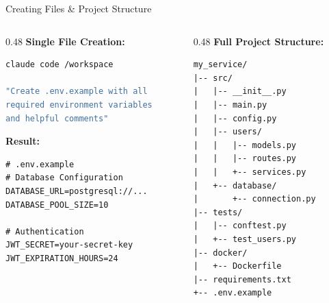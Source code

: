 \documentclass[aspectratio=169,11pt]{beamer}
\begin{document}
\begin{frame}[fragile]{Creating Files \& Project Structure}
    \begin{columns}[T]
        \begin{column}{0.48\textwidth}
            \textbf{Single File Creation:}
            \begin{lstlisting}[language=bash, basicstyle=\ttfamily\tiny]
claude code /workspace

"Create .env.example with all
required environment variables
and helpful comments"
            \end{lstlisting}

            \vspace{0.3cm}
            \textbf{Result:}
            \begin{lstlisting}[basicstyle=\ttfamily\tiny]
# .env.example
# Database Configuration
DATABASE_URL=postgresql://...
DATABASE_POOL_SIZE=10

# Authentication
JWT_SECRET=your-secret-key
JWT_EXPIRATION_HOURS=24
            \end{lstlisting}
        \end{column}
        \begin{column}{0.48\textwidth}
            \textbf{Full Project Structure:}
            \begin{lstlisting}[basicstyle=\ttfamily\tiny]
my_service/
|-- src/
|   |-- __init__.py
|   |-- main.py
|   |-- config.py
|   |-- users/
|   |   |-- models.py
|   |   |-- routes.py
|   |   +-- services.py
|   +-- database/
|       +-- connection.py
|-- tests/
|   |-- conftest.py
|   +-- test_users.py
|-- docker/
|   +-- Dockerfile
|-- requirements.txt
+-- .env.example
            \end{lstlisting}
        \end{column}
    \end{columns}

\end{frame}
\end{document}
